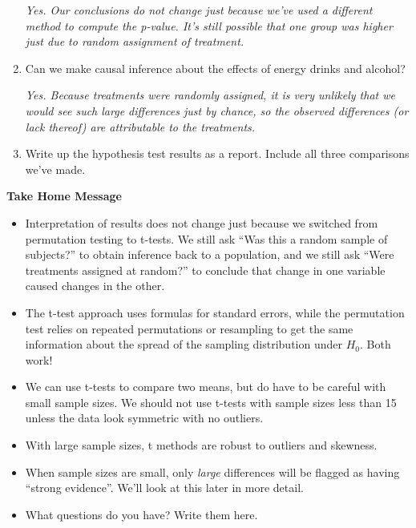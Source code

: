 \begin{enumerate}
\begin{key}
  {\it Yes.  Our conclusions do not change just because we've used a
    different method to compute the p-value.  It's still possible that
  one group was higher just due to random assignment of treatment.}
\end{key}
\item Can we make causal inference about the effects of energy drinks
  and alcohol?
\begin{students}
    \vspace{2cm}    
\end{students}

\begin{key}
  {\it  Yes.  Because treatments were randomly assigned, it is very
    unlikely that we would see such large differences just by chance,
    so the observed differences (or lack thereof) are attributable to
    the treatments.  }
\end{key}


\item Write up the hypothesis test results as a report.  Include all
  three comparisons we've made. \vfill
   
 \end{enumerate}
 \newpage

\begin{center}
  {\large\bf Take Home Message}
\end{center}

\begin{itemize}
  \item Interpretation of results does not change just because we
    switched from permutation testing to t-tests.  We still ask ``Was
    this a random sample of subjects?'' to obtain inference back to a
    population, and we still ask ``Were treatments assigned at
    random?'' to conclude that change in one variable caused changes
    in the other. 
  \item The t-test approach uses formulas for standard errors, while
    the permutation test relies on repeated permutations or resampling
    to get the same information about the spread of the sampling
    distribution under $H_0$.  Both work!
  \item We can use t-tests to compare two means, but do have to be
    careful with small sample sizes.  We should not use t-tests with
    sample sizes less than 15 unless the data look symmetric with no
    outliers.
  \item With large sample sizes, t methods are robust to outliers and
    skewness.
  \item When sample sizes are small, only {\em large} differences will
    be flagged as having ``strong evidence''.  We'll look at this
    later in more detail.
  \item What questions do you have?  Write them here.  \vfill
\end{itemize}




